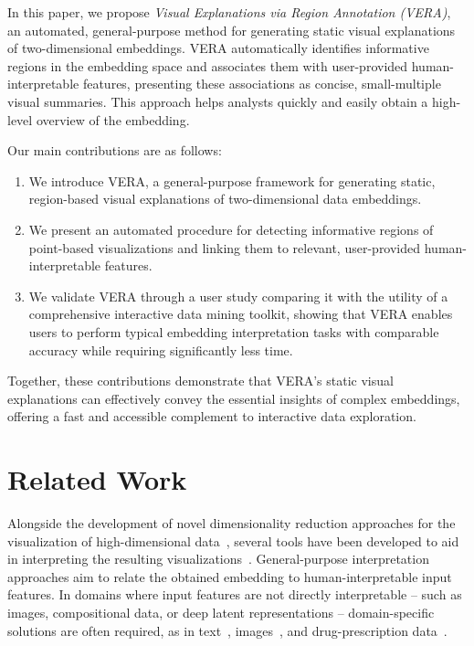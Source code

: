 \documentclass[lettersize,journal]{IEEEtran}
\begin{document}
In this paper, we propose \textit{Visual Explanations via Region Annotation (VERA)}, an automated, general-purpose method for generating static visual explanations of two-dimensional embeddings. VERA automatically identifies informative regions in the embedding space and associates them with user-provided human-interpretable features, presenting these associations as concise, small-multiple visual summaries. This approach helps analysts quickly and easily obtain a high-level overview of the embedding.

Our main contributions are as follows:
\begin{enumerate}
  \item We introduce VERA, a general-purpose framework for generating static, region-based visual explanations of two-dimensional data embeddings.
  \item We present an automated procedure for detecting informative regions of point-based visualizations and linking them to relevant, user-provided human-interpretable features.
  \item We validate VERA through a user study comparing it with the utility of a comprehensive interactive data mining toolkit, showing that VERA enables users to perform typical embedding interpretation tasks with comparable accuracy while requiring significantly less time.
\end{enumerate}

Together, these contributions demonstrate that VERA’s static visual explanations can effectively convey the essential insights of complex embeddings, offering a fast and accessible complement to interactive data exploration.

\section{Related Work}
\label{sec:related_work}

Alongside the development of novel dimensionality reduction approaches for the visualization of high-dimensional data~\cite{Kruskal1978,Maaten2008,McInnes2018}, several tools have been developed to aid in interpreting the resulting visualizations~\cite{ChengMueller2016,Marcilio2021,Fujiwara2020}.
General-purpose interpretation approaches aim to relate the obtained embedding to human-interpretable input features.
In domains where input features are not directly interpretable -- such as images, compositional data, or deep latent representations -- domain-specific solutions are often required, as in text~\cite{Heimerl2016,WangHohmanChau2023}, images~\cite{Liu2019,Ye2024}, and drug-prescription data~\cite{Policar2023}.
\end{document}
